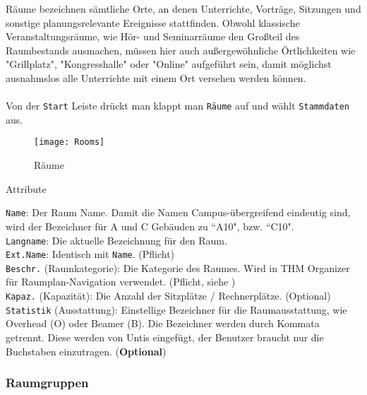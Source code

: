 \vspace{35pt}

Räume bezeichnen sämtliche Orte, an denen Unterrichte, Vorträge, Sitzungen und sonstige planungsrelevante Ereignisse stattfinden. Obwohl klassische Veranstaltungsräume, wie Hör- und Seminarräume den Großteil des Raumbestands ausmachen, müssen hier auch außergewöhnliche Örtlichkeiten wie "Grillplatz", "Kongresshalle" oder "Online" aufgeführt sein, damit möglichst ausnahmslos alle Unterrichte mit einem Ort versehen werden können.\\
\\
Von der \texttt{Start} Leiste drückt man klappt man \texttt{Räume} auf und wählt \texttt{Stammdaten} aus.

\begin{figure}[h]
	\centering
	\texttt{[image: Rooms]}
	\vspace{-5pt}
	\caption{Räume}
	\label{fig:rooms}
\end{figure}

\noindent
{\large Attribute\par}
\vspace{8pt}

\noindent
\texttt{Name}: Der Raum Name. Damit die Namen Campus-übergreifend eindeutig sind, wird der Bezeichner für A und C Gebäuden zu ``A10", bzw. ``C10".\\

\noindent
\texttt{Langname}: Die aktuelle Bezeichnung für den Raum.\\

\noindent
\texttt{Ext.Name}: Identisch mit \texttt{Name}. (Pflicht)\\

\noindent
\texttt{Beschr.} (Raumkategorie): Die Kategorie des Raumes. Wird in THM Organizer für Raumplan-Navigation verwendet. (Pflicht, siehe )\\

\noindent
\texttt{Kapaz.} (Kapazität): Die Anzahl der Sitzplätze / Rechnerplätze. (Optional)\\

\noindent
\texttt{Statistik} (Ausstattung): Einstellige Bezeichner für die Raumausstattung, wie Overhead (O) oder Beamer (B). Die Bezeichner werden durch Kommata getrennt. Diese werden von Untis eingefügt, der Benutzer braucht nur die Buchstaben einzutragen. (\textbf{Optional})\\

\subsubsection{Raumgruppen}

